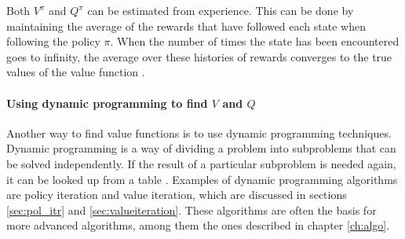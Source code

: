 Both $V^\pi$ and $Q^\pi$ can be estimated from experience. This can be done by
maintaining the average of the rewards that have followed each state when
following the policy $\pi$. When the number of times the state has been
encountered goes to infinity, the average over these histories of rewards
converges to the true values of the value function
\parencite{barto1998reinforcement}.

\paragraph{Using dynamic programming to find $V$ and $Q$}

Another way to find value functions is to use dynamic programming techniques. Dynamic programming is a way of dividing a problem into subproblems that can be
solved independently. If the result of a particular subproblem is needed again,
it can be looked up from a table \parencite{bellman1957mdp}. Examples of dynamic programming algorithms are
policy iteration and value iteration, which are discussed in sections
\ref{sec:pol_itr} and \ref{sec:valueiteration}. These algorithms are often the
basis for more advanced algorithms, among them the ones described in chapter
\ref{ch:algo}. 



